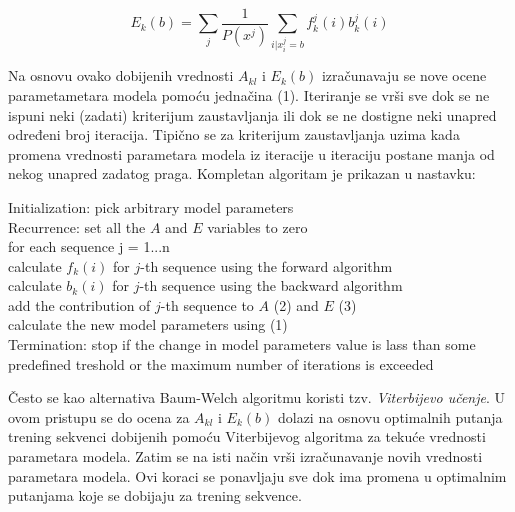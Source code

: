 \documentclass[a4paper, 12pt]{article}
\begin{document}
\begin{equation}\label{eq:pythagoras}
E_k(b) = \sum_{j}\frac{1}{P(x^j)}\sum_{i|x_i^j=b}f_k^j(i)b_k^j(i)
\end{equation}

\noindent Na osnovu ovako dobijenih vrednosti $A_{kl}$ i $E_k(b)$ izračunavaju se nove ocene parametametara modela pomoću jednačina (1). Iteriranje se vrši sve dok se ne ispuni neki (zadati) kriterijum zaustavljanja ili dok se ne dostigne neki unapred određeni broj iteracija. Tipično se za kriterijum zaustavljanja uzima kada promena vrednosti parametara modela iz iteracije u iteraciju postane manja od nekog unapred zadatog praga.
Kompletan algoritam je prikazan u nastavku:

\begin{algorithm}[h!] 
 \vspace*{0.2cm}
 Initialization: pick arbitrary model parameters \\
 \vspace*{0.2cm}
 Recurrence: \hspace{0.25cm} set all the $A$ and $E$ variables to zero \\
 	     \hspace{2.5cm} for each sequence j = 1...n \\
             \hspace{3.3cm} calculate $f_k(i)$ for $j$-th sequence using the forward algorithm \\
             \hspace{3.3cm} calculate $b_k(i)$ for $j$-th sequence using the backward algorithm \\
             \hspace{3.3cm} add the contribution of $j$-th sequence to $A$ (2) and $E$ (3) \\
             \hspace{2.5cm} calculate the new model parameters using (1) \\ 
 \vspace*{0.2cm}
 Termination: \hspace{0.05cm} stop if the change in model parameters value is lass than some \\
              \hspace{2.5cm} predefined treshold or the maximum number of iterations is exceeded \\
\end{algorithm}

Često se kao alternativa Baum-Welch algoritmu koristi tzv. \textit{Viterbijevo učenje}. U ovom pristupu se do ocena za $A_{kl}$ i $E_k(b)$ dolazi na osnovu optimalnih putanja trening sekvenci dobijenih pomoću Viterbijevog algoritma za tekuće vrednosti parametara modela. Zatim se na isti način vrši izračunavanje novih vrednosti parametara modela. Ovi koraci se ponavljaju sve dok ima promena u optimalnim putanjama koje se dobijaju za trening sekvence. \\
\end{document}
